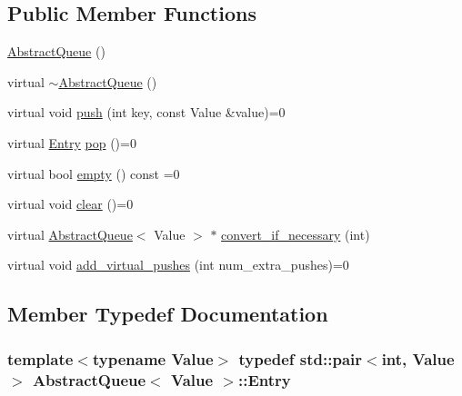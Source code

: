 \subsection*{Public Member Functions}
\begin{DoxyCompactItemize}
\item 
\hyperlink{classAbstractQueue_a65ca5c20345be92ce6b968715c5e9405}{Abstract\-Queue} ()
\item 
virtual \hyperlink{classAbstractQueue_a03cf0c0107bfdafb71c75872862e31fc}{$\sim$\-Abstract\-Queue} ()
\item 
virtual void \hyperlink{classAbstractQueue_af9268b0501749d8ab1b220a5db62a24e}{push} (int key, const Value \&value)=0
\item 
virtual \hyperlink{classAbstractQueue_abe60381528bc4cf9d4032f33f2ff6f3c}{Entry} \hyperlink{classAbstractQueue_aaec692216c729a7e7ca79b02a826cbf3}{pop} ()=0
\item 
virtual bool \hyperlink{classAbstractQueue_a38635110a147c0c1914e0f2f277a10de}{empty} () const =0
\item 
virtual void \hyperlink{classAbstractQueue_a2e976dcbc1ca3e97d05591cd466ff3e7}{clear} ()=0
\item 
virtual \hyperlink{classAbstractQueue}{Abstract\-Queue}$<$ Value $>$ $\ast$ \hyperlink{classAbstractQueue_a4c9793d6ec0442bbf806c2f57d6fd426}{convert\-\_\-if\-\_\-necessary} (int)
\item 
virtual void \hyperlink{classAbstractQueue_a2db622c67d66a0ee3d18e9e98145ece9}{add\-\_\-virtual\-\_\-pushes} (int num\-\_\-extra\-\_\-pushes)=0
\end{DoxyCompactItemize}


\subsection{Member Typedef Documentation}
\hypertarget{classAbstractQueue_abe60381528bc4cf9d4032f33f2ff6f3c}{
\subsubsection[{Entry}]{\setlength{\rightskip}{0pt plus 5cm}template$<$typename Value$>$ typedef std\-::pair$<$int, Value$>$ {\bf Abstract\-Queue}$<$ Value $>$\-::{\bf Entry}}}\label{classAbstractQueue_abe60381528bc4cf9d4032f33f2ff6f3c}


